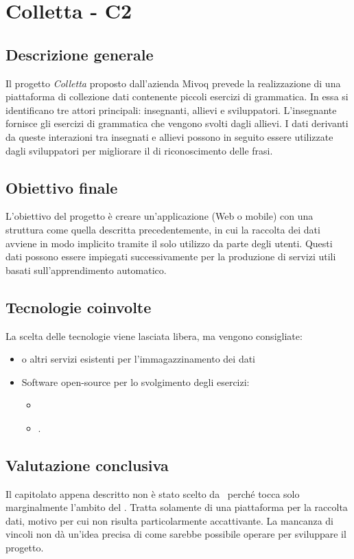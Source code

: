 \section{Colletta - C2} \label{c2}
    \subsection{Descrizione generale}
    Il progetto \textit{Colletta} proposto dall'azienda Mivoq prevede la realizzazione di una piattaforma di collezione dati contenente piccoli esercizi di grammatica.
    In essa si identificano tre attori principali: insegnanti, allievi e sviluppatori. L'insegnante fornisce gli esercizi di grammatica che vengono svolti dagli allievi.
    I dati derivanti da queste interazioni tra insegnati e allievi possono in seguito essere utilizzate dagli sviluppatori per migliorare il  di riconoscimento delle frasi.

    \subsection{Obiettivo finale}
    L'obiettivo del progetto è creare un'applicazione (Web o mobile) con una struttura come quella descritta precedentemente,
    in cui la raccolta dei dati avviene in modo implicito tramite il solo utilizzo da parte degli utenti. Questi dati possono essere impiegati successivamente per la produzione di
    servizi utili basati sull'apprendimento automatico.

    \subsection{Tecnologie coinvolte}
    La scelta delle tecnologie viene lasciata libera, ma vengono consigliate:
        \begin{itemize}
            \item {} o altri servizi esistenti per l'immagazzinamento dei dati
            \item Software open-source per lo svolgimento degli esercizi:
            \begin{itemize}
                \item {} 
                \item {}.
            \end{itemize}
        \end{itemize}

    \subsection{Valutazione conclusiva}
    Il capitolato appena descritto non è stato scelto da \gruppo\ perché tocca solo marginalmente l'ambito del .
    Tratta solamente di una piattaforma per la raccolta dati, motivo per cui non risulta particolarmente accattivante.
    La mancanza di vincoli non dà un'idea precisa di come sarebbe possibile operare per sviluppare il progetto.

